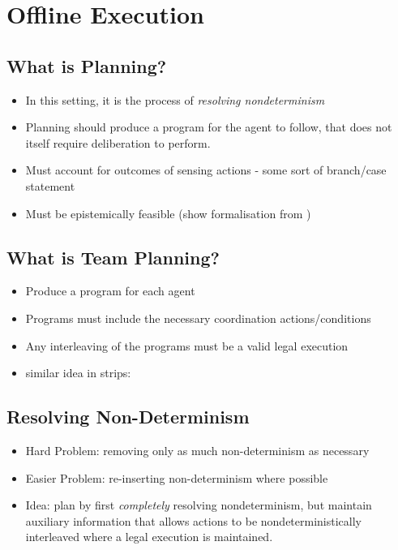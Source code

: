 \chapter{Offline Execution}\label{ch:offline-exec}

\section{What is Planning?}
\begin{itemize}
\item In this setting, it is the process of \emph{resolving nondeterminism}
\item Planning should produce a program for the agent to follow, that does
not itself require deliberation to perform. \cite{levesque96what_is_planning,giacomo04sem_delib_indigolog}
\item Must account for outcomes of sensing actions - some sort of branch/case statement
\item Must be epistemically feasible (show formalisation from \cite{giacomo04sem_delib_indigolog})
\end{itemize}

\section{What is Team Planning?}
\begin{itemize}
\item Produce a program for each agent
\item Programs must include the necessary coordination actions/conditions
\item Any interleaving of the programs must be a valid legal execution
\item similar idea in strips: \cite{boutilier01partialorder_conc}
\end{itemize}

\section{Resolving Non-Determinism}
\begin{itemize}
\item Hard Problem: removing only as much non-determinism as necessary
\item Easier Problem: re-inserting non-determinism where possible
\item Idea:  plan by first \emph{completely} resolving nondeterminism, but
maintain auxiliary information that allows actions to be nondeterministically 
interleaved where a legal execution is maintained.
\end{itemize}

